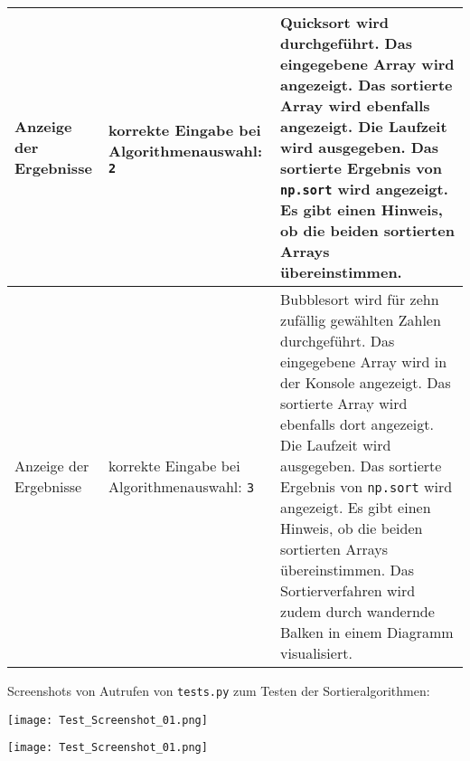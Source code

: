 \documentclass[a4paper]{article}
\begin{document}
\begin{exercise}{1}
\begin{center}
\begin{tabular}{| p{2.5cm} | p{3.2cm} | p{9cm} |}
		Anzeige der Ergebnisse & korrekte Eingabe bei Algorithmenauswahl: \newline \texttt{2}
		& Quicksort wird durchgef\"uhrt. Das eingegebene Array wird angezeigt. Das sortierte
		Array wird ebenfalls angezeigt. Die Laufzeit wird ausgegeben. Das sortierte Ergebnis von
		\texttt{np.sort} wird angezeigt. Es gibt einen Hinweis, ob die beiden sortierten Arrays
		\"ubereinstimmen. \\ \hline
		
		Anzeige der Ergebnisse & korrekte Eingabe bei Algorithmenauswahl: \newline \texttt{3}
		& Bubblesort wird f\"ur zehn zuf\"allig gew\"ahlten Zahlen durchgef\"uhrt. Das eingegebene
		Array wird in der Konsole angezeigt. Das sortierte Array wird ebenfalls dort angezeigt. Die
		Laufzeit wird ausgegeben. Das sortierte Ergebnis von \texttt{np.sort} wird angezeigt.
		Es gibt einen Hinweis, ob die beiden sortierten Arrays \"ubereinstimmen.
		Das Sortierverfahren wird zudem durch wandernde Balken in einem Diagramm
		visualisiert. \\ \hline	
		\end{tabular}
	\end{center}

\newpage

	Screenshots von Autrufen von \texttt{tests.py} zum Testen der Sortieralgorithmen:

	\begin{center}
		\texttt{[image: Test\_Screenshot\_01.png]}
	\end{center}
	\vspace*{1ex}
	\begin{center}
		\texttt{[image: Test\_Screenshot\_01.png]}
	\end{center}

\end{exercise}



\end{document}
